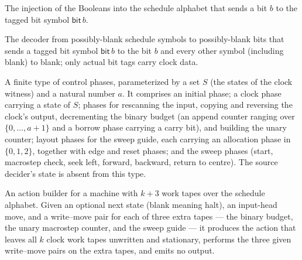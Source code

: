 \begin{definition}
\label{Complexity.oblEmbed}
\leanok
{}
The injection of the Booleans into the schedule alphabet that sends a bit $b$ to the
tagged bit symbol $\mathsf{bit}\,b$.
\end{definition}

\begin{definition}
\label{Complexity.clockBit}
\leanok
{}
The decoder from possibly-blank schedule symbols to possibly-blank bits that sends a
tagged bit symbol $\mathsf{bit}\,b$ to the bit $b$ and every other symbol (including
blank) to blank; only actual bit tags carry clock data.
\end{definition}

\begin{definition}
\label{Complexity.OblPhase}
\leanok
A finite type of control phases, parameterized by a set $S$ (the states of the clock
witness) and a natural number $a$. It comprises an initial phase; a clock phase
carrying a state of $S$; phases for rescanning the input, copying and reversing the
clock's output, decrementing the binary budget (an append counter ranging over
$\{0, \dots, a+1\}$ and a borrow phase carrying a carry bit), and building the unary
counter; layout phases for the sweep guide, each carrying an allocation phase in
$\{0, 1, 2\}$, together with edge and reset phases; and the sweep phases (start,
macrostep check, seek left, forward, backward, return to centre). The source
decider's state is absent from this type.
\end{definition}

\begin{definition}
\label{Complexity.oblAction}
\leanok
{}
An action builder for a machine with $k + 3$ work tapes over the schedule alphabet.
Given an optional next state (blank meaning halt), an input-head move, and a
write--move pair for each of three extra tapes — the binary budget, the unary
macrostep counter, and the sweep guide — it produces the action that leaves all $k$
clock work tapes unwritten and stationary, performs the three given write--move
pairs on the extra tapes, and emits no output.
\end{definition}

